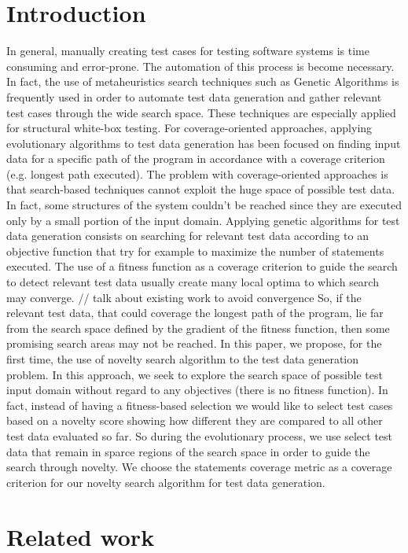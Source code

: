 \documentclass[conference]{IEEEtran}
\begin{document}
\section{Introduction}
In general, manually creating test cases for testing software systems is time consuming and error-prone. The automation of this process is become necessary. In fact, the use of metaheuristics search techniques such as Genetic Algorithms is frequently used in order to automate test data generation and gather relevant test cases through the wide search space. These techniques are especially applied for structural white-box testing. For coverage-oriented approaches, applying evolutionary algorithms to test data generation has been focused on finding input data for a specific path of the program in accordance with a coverage criterion (e.g. longest path executed). The problem with coverage-oriented approaches is that search-based techniques cannot exploit the huge space of possible test data. In fact, some structures of the system couldn’t be reached since they are executed only by a small portion of the input domain. Applying genetic algorithms for test data generation consists on searching for relevant test data according to an objective function that try for example to maximize the number of statements executed. The use of a fitness function as a coverage criterion to guide the search to detect relevant test data usually create many local optima to which search may converge. 
// talk about existing work to avoid convergence
So, if the relevant test data, that could coverage the longest path of the program, lie far from the search space defined by the gradient of the fitness function, then some promising search areas may not be reached. 
In this paper, we propose, for the first time, the use of novelty search algorithm to the test data generation problem. In this approach, we seek to explore the search space of possible test input domain without regard to any objectives (there is no fitness function). In fact, instead of having a fitness-based selection we would like to select test cases based on a novelty score showing how different they are compared to all other test data evaluated so far. So during the evolutionary process, we use select test data that remain in sparce regions of the search space in order to guide the search through novelty. We choose the statements coverage metric as a coverage criterion for our novelty search algorithm for test data generation. 

\section{Related work}
\end{document}
